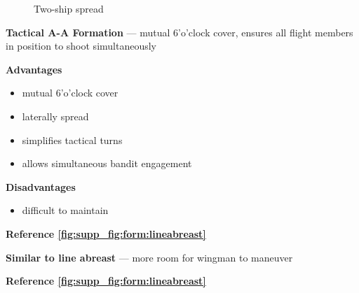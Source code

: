 \begin{figure}[htbp]
\begin{minipage}[b]{0.45\textwidth}
        \caption{Two-ship spread}
        \label{fig:supp_fig:form:spread}
    \end{minipage}
\end{figure}

\begin{tcoloritemize}
    \textbf{Tactical A-A Formation} --- mutual 6'o'clock cover, ensures all flight members in position to shoot simultaneously
    \medskip

    \textbf{Advantages}
    \begin{itemize}
        \item mutual 6'o'clock cover
        \item laterally spread
        \item simplifies tactical turns
        \item allows simultaneous bandit engagement
    \end{itemize}

    \textbf{Disadvantages}
    \begin{itemize}
        \item difficult to maintain
    \end{itemize}

    \hfill\textbf{Reference \cref{fig:supp_fig:form:lineabreast}}

    \blueitem[Spread]
    \textbf{Similar to line abreast} --- more room for wingman to maneuver

    \hfill\textbf{Reference \cref{fig:supp_fig:form:lineabreast}}
\end{tcoloritemize}



\clearpage